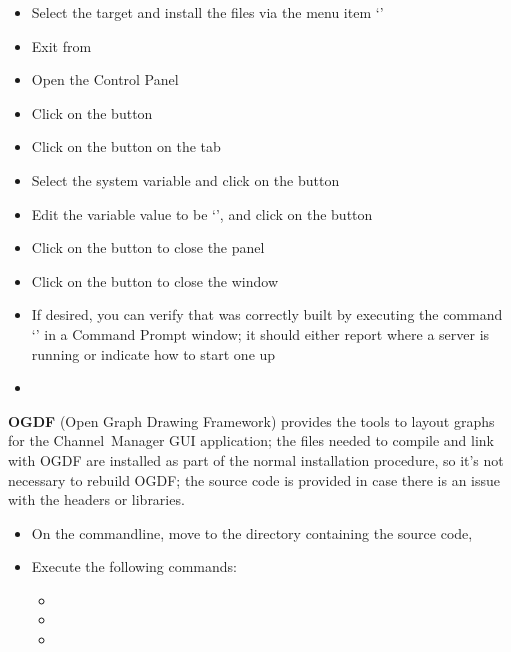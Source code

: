 \begin{itemize}
`'
\item\exSp{} Select the  target and install the  files via
the menu item `'
\item\exSp{} Exit from 
\item\exSp{} Open the  Control Panel
\item\exSp{} Click on the  button
\item\exSp{} Click on the  button on the 
tab
\item\exSp{} Select the  system variable and click on the
 button 
\item\exSp{} Edit the variable value to be
`', and click on the 
button
\item\exSp{} Click on the  button to close the 
panel
\item\exSp{} Click on the  button to close the 
window
\item\exSp{} If desired, you can verify that \yarp{} was correctly built by executing the
command `' in a Command Prompt window; it should either report where a
\yarp{} server is running or indicate how to start one up
\end{itemize}
\tertiaryEnd{}
\begin{itemize}
\item\TBD{}
\end{itemize}
\tertiaryEnd{}
\secondaryEnd{}
\textbf{OGDF} (Open Graph Drawing Framework) provides the tools to layout graphs for the
Channel~Manager GUI application; the files needed to compile and link with OGDF are
installed as part of the normal \mplusm{} installation procedure, so it's not necessary to
rebuild OGDF; the source code is provided in case there is an issue with the headers or
libraries.
\begin{itemize}
\item On the command\longDash{}line, move to the directory containing the \mplusm{} source
code, 
\item\exSp{} Execute the following commands:
\begin{itemize}
\item{}
\item\exSp{}
\item\exSp{}
\end{itemize}
\end{itemize}

